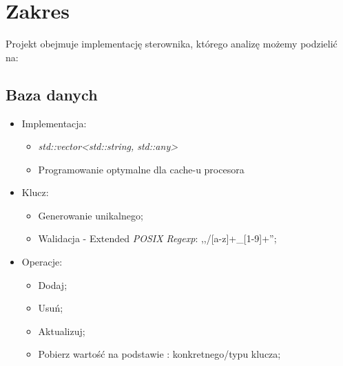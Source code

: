 \section{Zakres}
	Projekt obejmuje implementację sterownika, którego analizę możemy podzielić na:

	\subsection{Baza danych}
	\begin{itemize}
		\item Implementacja:
		\begin{itemize}
			\item \textit{std::vector<std::string, std::any>}
			\item Programowanie optymalne dla cache-u procesora
		\end{itemize}
		\item Klucz:
		\begin{itemize}
			\item Generowanie unikalnego;
			\item Walidacja - Extended \textit{POSIX Regexp}: ,,/[a-z]+\_[1-9]+'';
		\end{itemize}
		\item Operacje:
		\begin{itemize}
			\item Dodaj;
			\item Usuń;
			\item Aktualizuj;
			\item Pobierz wartość na podstawie : konkretnego/typu klucza;
		\end{itemize}
	\end{itemize}

